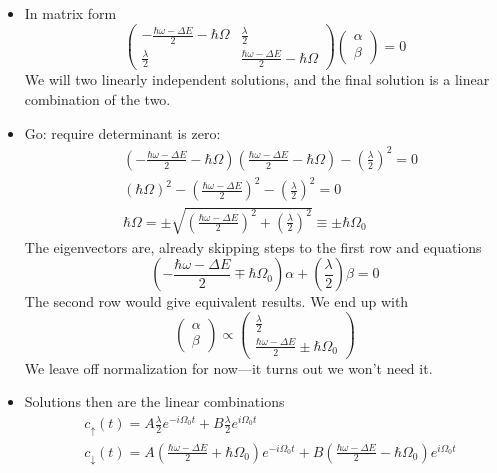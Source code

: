 \documentclass[11pt, a4paper]{article}
\newcommand{\ua}{\uparrow}  %
\newcommand{\da}{\downarrow}  %
\begin{document}
\begin{itemize}
	\item In matrix form
	\begin{equation*}
		\begin{pmatrix}
			-\frac{\hbar \omega - \Delta E}{2} - \hbar \Omega & \frac{\lambda}{2}\\
			\frac{\lambda}{2} & \frac{\hbar \omega - \Delta E}{2} - \hbar \Omega
		\end{pmatrix}
		\begin{pmatrix}
		\alpha\\
		\beta
		\end{pmatrix}
		= 0
	\end{equation*}
	We will two linearly independent solutions, and the final solution is a linear combination of the two.
	
	\item Go: require determinant is zero:
	\begin{align*}
		&\left(-\frac{\hbar \omega - \Delta E}{2} - \hbar \Omega\right)\left(\frac{\hbar \omega - \Delta E}{2} - \hbar \Omega\right) - \left(\frac{\lambda}{2}\right)^{2} = 0\\
		&(\hbar \Omega)^{2} - \left(\frac{\hbar \omega - \Delta E}{2}\right)^{2} - \left(\frac{\lambda}{2}\right)^{2} = 0\\
		& \hbar \Omega = \pm \sqrt{\left(\frac{\hbar \omega - \Delta E}{2}\right)^{2} + \left(\frac{\lambda}{2}\right)^{2}} \equiv \pm \hbar \Omega_{0}
	\end{align*}
	The eigenvectors are, already skipping steps to the first row and equations
	\begin{equation*}
		\left(- \frac{\hbar \omega - \Delta E}{2} \mp \hbar \Omega_{0}\right)\alpha + \left(\frac{\lambda}{2}\right)\beta = 0
	\end{equation*}
	The second row would give equivalent results. We end up with
	\begin{equation*}
		\begin{pmatrix}
			\alpha\\
			\beta
		\end{pmatrix}
		\propto
		\begin{pmatrix}
			\frac{\lambda}{2}\\
			\frac{\hbar \omega - \Delta E}{2} \pm \hbar \Omega_{0}
		\end{pmatrix}
	\end{equation*}
	We leave off normalization for now---it turns out we won't need it.
	
	\item Solutions then are the linear combinations
	\begin{align*}
		& c_{\ua}(t) = A\frac{\lambda}{2}e^{-i\Omega_{0}t} + B  \frac{\lambda}{2}e^{i\Omega_{0}t}\\
		& c_{\da}(t) = A\left(\frac{\hbar \omega - \Delta E}{2} + \hbar \Omega_{0}\right)e^{-i\Omega_{0}t} + B\left(\frac{\hbar \omega - \Delta E}{2} - \hbar \Omega_{0}\right)e^{i\Omega_{0}t}
	\end{align*}
	

\end{itemize}
\end{document}
